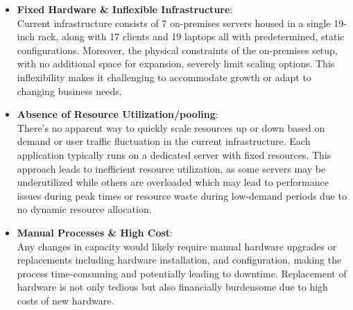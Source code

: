 \documentclass{llncs}
\begin{document}
\begin{itemize}
  \item \textbf{Fixed Hardware \& Inflexible Infrastructure}:
  \\
  Current infrastructure consists of 7 on-premises servers housed in a single 19-inch rack, 
  along with 17 clients and 19 laptops all with predetermined, static configurations. 
  Moreover, the physical constraints of the on-premises setup, with no additional space for expansion, severely limit scaling options. 
  This inflexibility makes it challenging to accommodate growth or adapt to changing business needs.
 \\
  \item \textbf{Absence of Resource Utilization/pooling}:
  \\ 
  There's no apparent way to quickly scale resources up or down based on demand or user traffic fluctuation in the current infrastructure. 
  Each application typically runs on a dedicated server with fixed resources. 
  This approach leads to inefficient resource utilization, as some servers may be underutilized while others are overloaded which may lead to performance issues during peak times or resource waste during low-demand periods due to no dynamic resource allocation.
 \\
  \item \textbf{Manual Processes \& High Cost}:
  \\ 
  Any changes in capacity would likely require manual hardware upgrades or replacements including hardware installation,
  and configuration, making the process time-consuming and potentially leading to downtime.
  Replacement of hardware is not only tedious but also financially burdensome due to high costs of new hardware.

\end{itemize}
\end{document}
